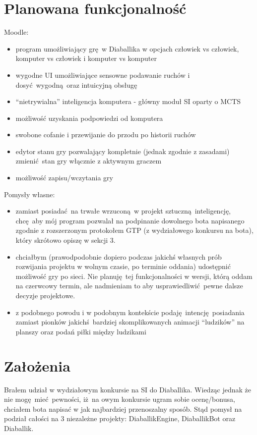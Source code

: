 \documentclass[a4paper,12pt]{article}
\begin{document}
\section{Planowana funkcjonalność}
Moodle:
\begin{itemize}
\item program umożliwiający grę w Diaballika w opcjach człowiek vs człowiek, komputer vs człowiek i komputer vs komputer
\item wygodne UI umożliwiające sensowne podawanie ruchów i dosyć wygodną oraz intuicyjną obsługę
\item ``nietrywialna'' inteligencja komputera - główny moduł SI oparty o MCTS
\item możliwość uzyskania podpowiedzi od komputera
\item swobone cofanie i przewijanie do przodu po historii ruchów
\item edytor stanu gry pozwalający kompletnie (jednak zgodnie z zasadami) zmienić stan gry włącznie z aktywnym graczem
\item możliwość zapisu/wczytania gry
\end{itemize}
Pomysły własne:
\begin{itemize}
\item zamiast posiadać na trwałe wrzuconą w projekt sztuczną inteligencję, chcę aby mój program pozwalał na podpinanie dowolnego bota napisanego
zgodnie z rozszerzonym protokołem GTP (z wydziałowego konkursu na bota), który skrótowo opiszę w sekcji 3.
\item chciałbym (prawodpodobnie dopiero podczas jakichś własnych prób rozwijania projektu  w wolnym czasie, po terminie oddania) udostępnić możliwość
gry po sieci. Nie planuję tej funkcjonalności w wersji, którą oddam na czerwcowy termin, ale nadmieniam to aby usprawiedliwić pewne dalsze decyzje 
projektowe.
\item z podobnego powodu i w podobnym kontekście podaję intencję posiadania zamiast pionków jakichś bardziej skomplikowanych animacji ``ludzików'' na
planszy oraz podań piłki między ludzikami
\end{itemize}

\section{Założenia}
Brałem udział w wydziałowym konkursie na SI do Diaballika. Wiedząc jednak że nie mogę mieć pewności, iż na owym konkursie ugram sobie ocenę/bonusa,
chciałem bota napisać w jak najbardziej przenoszalny sposób. Stąd pomysł na podział całości na 3 niezależne projekty: DiaballikEngine, DiaballikBot
oraz Diaballik. 
\end{document}
